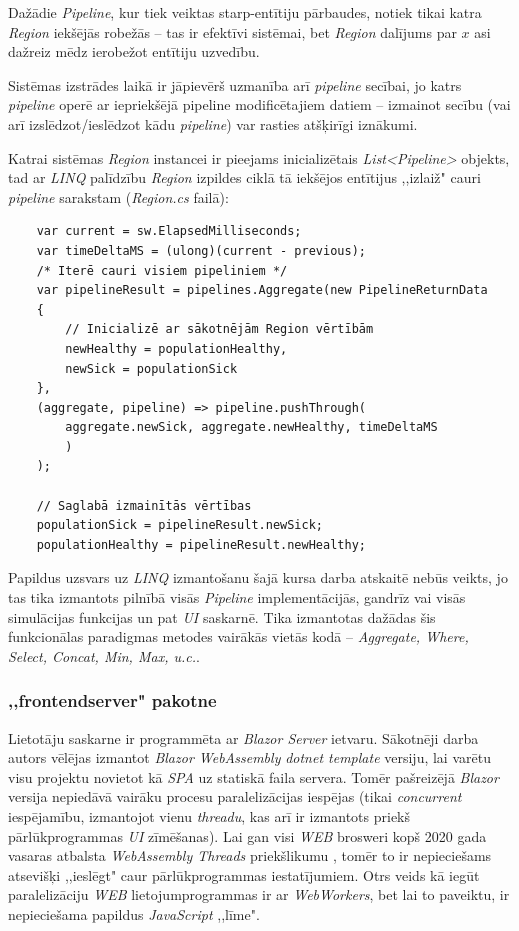 Dažādie \emph{Pipeline}, kur tiek veiktas starp-entītiju pārbaudes, notiek tikai
katra \emph{Region} iekšējās robežās -- tas ir efektīvi sistēmai, bet \emph{Region}
dalījums par \(x\) asi dažreiz mēdz ierobežot entītiju uzvedību.

Sistēmas izstrādes laikā ir jāpievērš uzmanība arī \emph{pipeline} secībai, jo katrs \emph{pipeline}
operē ar iepriekšējā pipeline modificētajiem datiem -- izmainot secību
(vai arī izslēdzot/ieslēdzot kādu \emph{pipeline}) var rasties atšķirīgi iznākumi.

Katrai sistēmas \emph{Region} instancei ir pieejams inicializētais \emph{List<Pipeline>}
objekts, tad ar \emph{LINQ} palīdzību \emph{Region} izpildes ciklā tā iekšējos entītijus
,,izlaiž" cauri \emph{pipeline} sarakstam (\emph{Region.cs} failā):

{
\begin{verbatim}
    var current = sw.ElapsedMilliseconds;
    var timeDeltaMS = (ulong)(current - previous);
    /* Iterē cauri visiem pipeliniem */
    var pipelineResult = pipelines.Aggregate(new PipelineReturnData
    {
        // Inicializē ar sākotnējām Region vērtībām
        newHealthy = populationHealthy,
        newSick = populationSick
    },
    (aggregate, pipeline) => pipeline.pushThrough(
        aggregate.newSick, aggregate.newHealthy, timeDeltaMS
        )
    );

    // Saglabā izmainītās vērtības
    populationSick = pipelineResult.newSick;
    populationHealthy = pipelineResult.newHealthy;
\end{verbatim}
}

Papildus uzsvars uz \emph{LINQ} izmantošanu šajā kursa darba atskaitē nebūs veikts,
jo tas tika izmantots pilnībā visās \emph{Pipeline} implementācijās, gandrīz vai
visās simulācijas funkcijas un pat \emph{UI} saskarnē. Tika izmantotas dažādas šis
funkcionālas paradigmas metodes vairākās vietās kodā -- \emph{Aggregate, Where, Select, Concat, Min, Max, u.c.}.


\subsubsection{,,frontendserver" pakotne}


Lietotāju saskarne ir programmēta ar \emph{Blazor Server} ietvaru. Sākotnēji darba
autors vēlējas izmantot \emph{Blazor WebAssembly} \emph{dotnet template} versiju,
lai varētu visu projektu novietot kā \emph{SPA}\cite{progr:SPA} uz statiskā faila servera. Tomēr
pašreizējā \emph{Blazor} versija nepiedāvā vairāku procesu paralelizācijas iespējas
(tikai \emph{concurrent} iespējamību, izmantojot vienu \emph{threadu}, kas arī ir
izmantots priekš pārlūkprogrammas \emph{UI} zīmēšanas)\cite{csharp:blazor-no-multithreaded-support}. Lai gan
visi \emph{WEB} brosweri kopš 2020 gada vasaras atbalsta \emph{WebAssembly Threads}
priekšlikumu \cite{wasm:threads-proposal}, tomēr to ir nepieciešams atsevišķi
,,ieslēgt" caur pārlūkprogrammas iestatījumiem. Otrs veids kā iegūt paralelizāciju \emph{WEB}
lietojumprogrammas ir ar \emph{WebWorkers}, bet lai to paveiktu, ir nepieciešama
papildus \emph{JavaScript} ,,līme".

